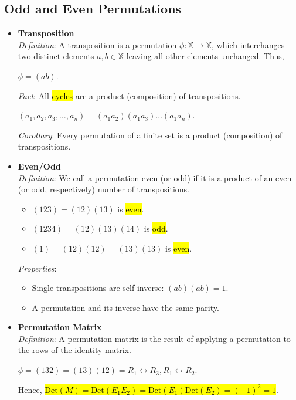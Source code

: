 \documentclass{article}
\begin{document}
\subsection*{Odd and Even Permutations}
\begin{itemize}
    \item \textbf{Transposition}\\
    \textit{Definition}: A transposition is a permutation 
    $\phi: \mathbb{X} \rightarrow \mathbb{X}$, which interchanges two distinct elements $a,b \in \mathbb{X}$ leaving all other elements unchanged. Thus,
    \begin{center}
        $\phi = (ab)$.
    \end{center}
    
    \textit{Fact}: All \hl{cycles} are a product (composition) of transpositions.
    \begin{center}
        $(a_1,a_2,a_3, \ldots, a_n) = (a_1 a_2)(a_1a_3)\ldots(a_1a_n)$.
    \end{center}
    
    \textit{Corollary}: Every permutation of a finite set is a product (composition) of transpositions.
    
    \item \textbf{Even/Odd}\\
    \textit{Definition}: We call a permutation even (or odd) if it is a product of an even (or odd, respectively) number of transpositions.
    \begin{itemize}
        \item $(123) = (12)(13)$ is \hl{even}.
        \item $(1234) = (12)(13)(14)$ is \hl{odd}.
        \item $(1) = (12)(12) = (13)(13)$ is \hl{even}.
    \end{itemize}
    \textit{Properties}:
    \begin{itemize}
        \item Single transpositions are self-inverse: $(ab)(ab) = 1$.
        \item A permutation and its inverse have the same parity.
    \end{itemize}


    \item \textbf{Permutation Matrix}\\
    \textit{Definition}: A permutation matrix is the result of applying a permutation to the rows of the identity matrix.
    \begin{center}
        $\phi = (132) = (13)(12) = R_1 \leftrightarrow R_3, R_1 \leftrightarrow R_2$.
    \end{center}
    Hence, \hl{$\text{Det}(M) = \text{Det}(E_1 E_2) = \text{Det}(E_1)\text{Det}(E_2) = (-1)^2 = 1$}.

\end{itemize}
\newpage
\end{document}
